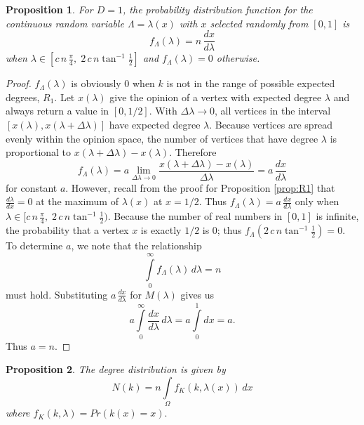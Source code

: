 \documentclass[a4paper,10pt]{article}
\newtheorem{prop}{Proposition}
\begin{document}
\begin{prop}
 For $D=1$, the probability distribution function for the continuous random variable $\Lambda = \lambda(x)$ with $x$ selected randomly from $[0, 1]$ is
 \begin{equation}
  f_\Lambda(\lambda) = n \,\frac{dx}{d\lambda}
 \end{equation}
when $\lambda \in [c\,n\,\frac{\pi}{4},\; 2\,c\,n \tan^{-1}\frac{1}{2}]$ and $f_\Lambda(\lambda) = 0$ otherwise. \end{prop}
\begin{proof}
$f_\Lambda(\lambda)$ is obviously 0 when $k$ is not in the range of possible expected degrees, $R_1$. Let $x(\lambda)$ give the opinion of a vertex with expected degree $\lambda$ and always return a value in $[0, 1/2]$. With $\Delta \lambda \to 0$, all vertices in the interval $[x(\lambda), x(\lambda + \Delta \lambda)]$ have expected degree $\lambda$. Because vertices are spread evenly within the opinion space, the number of vertices that have degree $\lambda$ is proportional to $x(\lambda + \Delta \lambda) - x(\lambda)$. Therefore
\begin{equation}
 f_\Lambda(\lambda) = a \lim\limits_{\Delta \lambda \to 0} \frac{x(\lambda + \Delta \lambda) - x(\lambda)}{\Delta \lambda} = a \, \frac{dx}{d\lambda}
\end{equation}
for constant $a$. However, recall from the proof for Proposition \ref{prop:R1} that $\frac{d\lambda}{dx} = 0$ at the maximum of $\lambda(x)$ at $x=1/2$. Thus $f_\Lambda(\lambda) = a \, \frac{dx}{d\lambda}$ only when $\lambda \in  [c\,n\,\frac{\pi}{4},\; 2\,c\,n \tan^{-1}\frac{1}{2})$. Because the number of real numbers in $[0, 1]$ is infinite, the probability that a vertex $x$ is exactly $1/2$ is 0; thus $f_\Lambda(2\,c\,n \tan^{-1}\frac{1}{2}) = 0$. To determine $a$, we note that the relationship 
\begin{equation}
 \int\limits_{0}^\infty f_\Lambda(\lambda)\, d\lambda = n
\end{equation}
must hold. Substituting $a \, \frac{dx}{d\lambda}$ for $M(\lambda)$ gives us 
\begin{equation}
 a\int\limits_{0}^\infty \frac{dx}{d\lambda} \, d\lambda = a\int\limits_{0}^1 dx = a.
\end{equation}
Thus $a = n$.
\end{proof}

\begin{prop}
 The degree distribution is given by
 \begin{equation}
  N(k) = n \int\limits_\Omega f_K(k, \lambda(x))\, dx
 \end{equation}
 where $f_K(k, \lambda) = Pr(k(x) = x).$ 
\end{prop}
\end{document}

